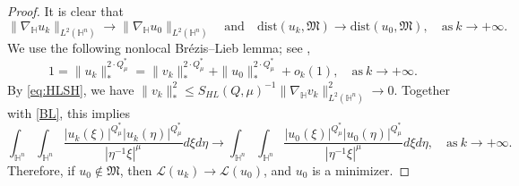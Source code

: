 \documentclass[11pt]{article}
\begin{document}
\begin{proof}
It is clear that
\begin{equation*}
\|\nabla_\mathbb{H} u_k\|_{L^2(\mathbb{H}^n)}\rightarrow \|\nabla_\mathbb{H} u_0\|_{L^2(\mathbb{H}^n)}\quad \mathrm{and}\quad \mathrm{dist}(u_k,\mathfrak{M})\rightarrow \mathrm{dist}(u_0,\mathfrak{M}),\quad \mathrm{as}~ k\rightarrow+\infty.
\end{equation*}
 {We use the following nonlocal Br\'{e}zis--Lieb lemma; see
\cite[Lemma 2.5]{GS20},}
\begin{equation}\label{BL}
 1=\|u_k\|_*^{2\cdot Q^{\ast}_{\mu}}=\|v_k\|_*^{2\cdot Q^{\ast}_{\mu}}+\|u_0\|_*^{2\cdot Q^{\ast}_{\mu}}+o_k(1),\quad \mathrm{as} ~k\rightarrow+\infty.
\end{equation}
By \eqref{eq:HLSH}, we have $\|v_k\|_*^{2}\leq S_{HL}(Q,\mu)^{-1} \|\nabla_\mathbb{H} v_k\|_{L^2(\mathbb{H}^n)}^2\rightarrow0$.
{Together with \eqref{BL}, this implies}
\begin{equation*}
 \int_{\mathbb{H}^{n}}\int_{\mathbb{H}^{n}}\frac{|u_k(\xi)|^{Q^{\ast}_{\mu}}|u_k(\eta)|
^{Q^{\ast}_{\mu}}}{|\eta^{-1}\xi|^{\mu}}{d}\xi{d}\eta\longrightarrow \int_{\mathbb{H}^{n}}\int_{\mathbb{H}^{n}}\frac{|u_0(\xi)|^{Q^{\ast}_{\mu}}|u_0(\eta)|
^{Q^{\ast}_{\mu}}}{|\eta^{-1}\xi|^{\mu}}{d}\xi{d}\eta,\quad \mathrm{as}~k\rightarrow+\infty.
\end{equation*}
Therefore, if $u_0\notin \mathfrak{M}$, then $\mathcal {L}(u_k)\rightarrow \mathcal {L}(u_0)$, and $u_0$ is a minimizer.


\end{proof}
\end{document}
